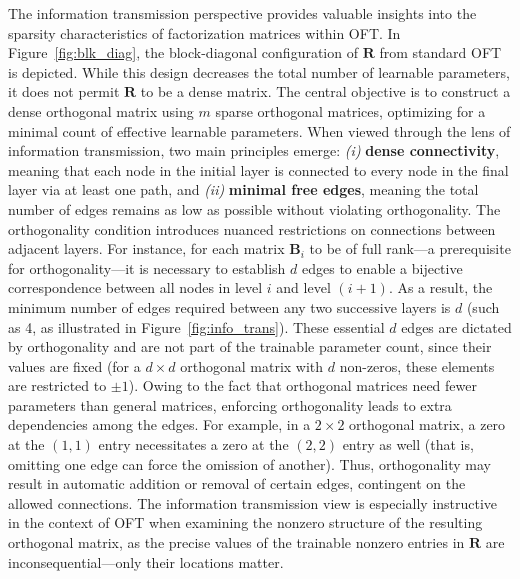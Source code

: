 The information transmission perspective provides valuable insights into the sparsity characteristics of factorization matrices within OFT. In Figure~\ref{fig:blk_diag}, the block-diagonal configuration of $\bm{R}$ from standard OFT is depicted. While this design decreases the total number of learnable parameters, it does not permit $\bm{R}$ to be a dense matrix. The central objective is to construct a dense orthogonal matrix using $m$ sparse orthogonal matrices, optimizing for a minimal count of effective learnable parameters. When viewed through the lens of information transmission, two main principles emerge: \emph{(i)} \textbf{dense connectivity}, meaning that each node in the initial layer is connected to every node in the final layer via at least one path, and \emph{(ii)} \textbf{minimal free edges}, meaning the total number of edges remains as low as possible without violating orthogonality. The orthogonality condition introduces nuanced restrictions on connections between adjacent layers. For instance, for each matrix $\bm{B}_i$ to be of full rank—a prerequisite for orthogonality—it is necessary to establish $d$ edges to enable a bijective correspondence between all nodes in level $i$ and level $(i+1)$. As a result, the minimum number of edges required between any two successive layers is $d$ (such as 4, as illustrated in Figure~\ref{fig:info_trans}). These essential $d$ edges are dictated by orthogonality and are not part of the trainable parameter count, since their values are fixed (for a $d\times d$ orthogonal matrix with $d$ non-zeros, these elements are restricted to $\pm 1$). Owing to the fact that orthogonal matrices need fewer parameters than general matrices, enforcing orthogonality leads to extra dependencies among the edges. For example, in a $2\times 2$ orthogonal matrix, a zero at the $(1,1)$ entry necessitates a zero at the $(2,2)$ entry as well (that is, omitting one edge can force the omission of another). Thus, orthogonality may result in automatic addition or removal of certain edges, contingent on the allowed connections. The information transmission view is especially instructive in the context of OFT when examining the nonzero structure of the resulting orthogonal matrix, as the precise values of the trainable nonzero entries in $\bm{R}$ are inconsequential—only their locations matter.

